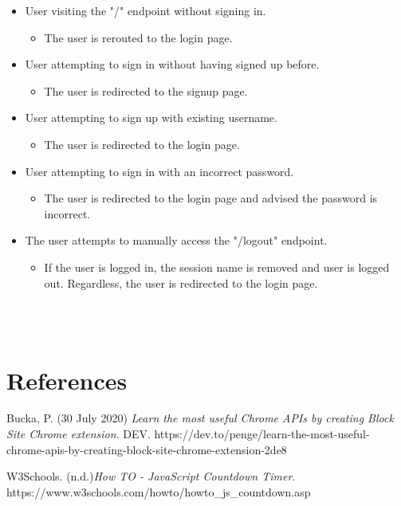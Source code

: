 \documentclass[12pt]{article}
\begin{document}
\begin{itemize}
    \item User visiting the "/" endpoint without signing in.
    \begin{itemize}
        \item The user is rerouted to the login page.
    \end{itemize}
    \item User attempting to sign in without having signed up before.
    \begin{itemize}
        \item The user is redirected to the signup page.
    \end{itemize}
    \item User attempting to sign up with existing username.
    \begin{itemize}
        \item The user is redirected to the login page.
    \end{itemize}
    \item User attempting to sign in with an incorrect password.
    \begin{itemize}
        \item The user is redirected to the login page and advised the password is incorrect.
    \end{itemize}
    \item The user attempts to manually access the "/logout" endpoint.
    \begin{itemize}
        \item If the user is logged in, the session name is removed and user is logged out. Regardless, the user is redirected to the login page.
    \end{itemize}
\end{itemize}\\\\

\section{References}

\begingroup
\renewcommand{\section}[2]{}
\begin{thebibliography}{10}
    Bucka, P. (30 July 2020) \textit{Learn the most useful Chrome APIs by creating Block Site Chrome extension}.
    DEV. https://dev.to/penge/learn-the-most-useful-chrome-apis-by-creating-block-site-chrome-extension-2de8

    W3Schools. (n.d.)\textit{How TO - JavaScript Countdown Timer}. https://www.w3schools.com/howto/howto_js_countdown.asp

    \bigskip
\end{thebibliography}
\endgroup
\end{document}
